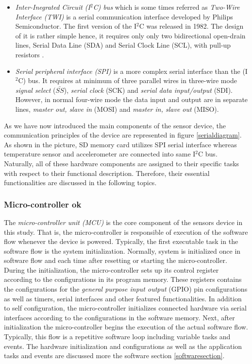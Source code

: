 \documentclass[english,12pt,a4paper,pdftex,elec,utf8]{aaltothesis}
\begin{document}
\begin{itemize}
\item \textit{Inter-Inegrated Circuit (I$^2$C) bus} which is some times referred as \textit{Two-Wire Interface (TWI)} is a serial communication interface developed by Philips Semiconductor. The first version of  the I$^2$C was released in 1982. The design of it is rather simple hence, it requires only only two bidirectional open-drain lines, Serial Data Line (SDA) and Serial Clock Line (SCL), with pull-up resistors \cite{i2cmanual}.


\item \textit{Serial peripheral interface (SPI)} \cite{spimanual} is a more complex serial interface than the (I$^2$C) bus. It requires at minimum of three parallel wires in three-wire mode \cite{bma222datasheet} \textit{signal select} ($\bar{SS}$), \textit{serial clock} (SCK) and \textit{serial data input/output} (SDI). However, in normal four-wire mode the data input and output are in separate lines, \textit{master out, slave in} (MOSI) and \textit{master in, slave out} (MISO).
\end{itemize}  As we have now introduced the main components of the sensor device, the communication principles of the device are represented in figure \ref{serialdiagram}. As shown in the picture, SD memory card utilizes SPI serial interface whereas temperature sensor and accelerometer are connected into same I$^2$C bus. Naturally, all of these hardware components are assigned to their specific tasks with respect to their functional description. Therefore, their essential functionalities are discussed in the following topics.




\subsubsection*{Micro-controller ok}

The \textit{micro-controller unit (MCU)} is the core component of the sensors device in this study. That is, the micro-controller is responsible of execution of the software flow whenever the device is powered. Typically, the first executable task in the software flow is the system initialization. Normally, system is initialized once in software flow and each time after resetting or starting the micro-controller. During the initialization, the micro-controller sets up its control register according to the configurations in its program memory. These registers contains the configurations for the \textit{general purpose input output} (GPIO) pin configurations as well as timers, serial interfaces and other featured functionalities. In addition to self configuration, the micro-controller initializes connected hardware via serial interfaces according to the configurations in the software memory. Next, after initialization the micro-controller begins the execution of the actual software flow. Typically, this flow is a repetitive software loop including variable tasks and events. The hardware initialization and configurations as well as the application tasks and events are discussed more the software section \ref{softwaresection}.
\end{document}
